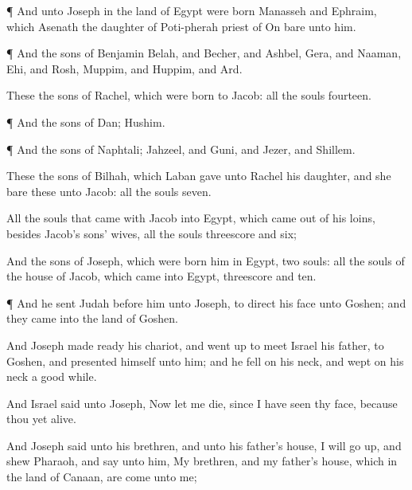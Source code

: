 {\par }{\PP {}¶ And unto
Joseph in the
land of
Egypt were
born
Manasseh and
Ephraim, which
Asenath the
daughter of
Poti-pherah
priest of
On
bare unto him.


\par }{\PP {}¶ And the
sons of
Benjamin
{}
Belah, and
Becher, and
Ashbel,
Gera, and
Naaman,
Ehi, and
Rosh,
Muppim, and
Huppim, and
Ard.

These
{} the
sons of
Rachel, which were
born to
Jacob: all the
souls
{}
fourteen.


\par }{\PP {}¶ And the
sons of
Dan;
Hushim.


\par }{\PP {}¶ And the
sons of
Naphtali;
Jahzeel, and
Guni, and
Jezer, and
Shillem.

These
{} the
sons of
Bilhah, which
Laban
gave unto
Rachel his
daughter, and she
bare these unto
Jacob: all the
souls
{}
seven.

All the
souls that
came with
Jacob into
Egypt, which came
out of his
loins, besides
Jacob’s
sons’
wives, all the
souls
{}
threescore and
six;

And the
sons of
Joseph, which were
born him in
Egypt,
{}
two
souls: all the
souls of the
house of
Jacob, which
came into
Egypt,
{} threescore and
ten.


\par }{\PP {}¶ And he
sent
Judah before
him unto
Joseph, to
direct his
face unto
Goshen; and they
came into the
land of
Goshen.

And
Joseph made
ready his
chariot, and went
up to
meet
Israel his
father, to
Goshen, and
presented himself unto him; and he
fell on his
neck, and
wept on his
neck a good
while.

And
Israel
said unto
Joseph,
Now let me
die,
since I have
seen thy
face, because thou
{}
yet
alive.

And
Joseph
said unto his
brethren, and unto his
father’s
house, I will go
up, and
shew
Pharaoh, and
say unto him, My
brethren, and my
father’s
house, which
{} in the
land of
Canaan, are
come unto me;

}
